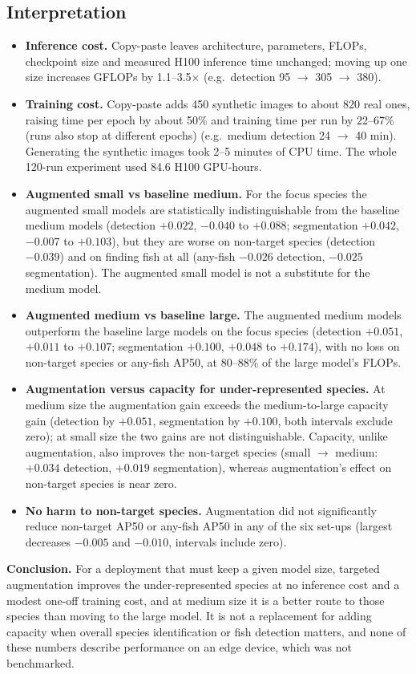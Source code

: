 \documentclass[11pt,a4paper]{article}
\begin{document}
\subsection*{Interpretation}
\begin{itemize}
\item \textbf{Inference cost.} Copy-paste leaves architecture, parameters, FLOPs, checkpoint size and measured H100 inference time
unchanged; moving up one size increases GFLOPs by 1.1--3.5$\times$ (e.g.\ detection 95 $\rightarrow$ 305 $\rightarrow$ 380).
\item \textbf{Training cost.} Copy-paste adds 450 synthetic images to about 820 real ones, raising time per epoch by about 50\% and
training time per run by 22--67\% (runs also stop at different epochs) (e.g.\ medium detection 24 $\rightarrow$ 40 min). Generating the synthetic images took 2--5
minutes of CPU time. The whole 120-run experiment used 84.6 H100 GPU-hours.
\item \textbf{Augmented small vs baseline medium.} For the focus species the augmented small models are statistically
indistinguishable from the baseline medium models (detection $+0.022$, $-0.040$ to $+0.088$; segmentation $+0.042$, $-0.007$ to $+0.103$),
but they are worse on non-target species (detection $-0.039$) and on finding fish at all (any-fish $-0.026$ detection, $-0.025$
segmentation). The augmented small model is not a substitute for the medium model.
\item \textbf{Augmented medium vs baseline large.} The augmented medium models outperform the baseline large models on the focus
species (detection $+0.051$, $+0.011$ to $+0.107$; segmentation $+0.100$, $+0.048$ to $+0.174$), with no loss on non-target species or
any-fish AP50, at 80--88\% of the large model's FLOPs.
\item \textbf{Augmentation versus capacity for under-represented species.} At medium size the augmentation gain exceeds the
medium-to-large capacity gain (detection by $+0.051$, segmentation by $+0.100$, both intervals exclude zero); at small size the two
gains are not distinguishable. Capacity, unlike augmentation, also improves the non-target species (small $\rightarrow$ medium:
$+0.034$ detection, $+0.019$ segmentation), whereas augmentation's effect on non-target species is near zero.
\item \textbf{No harm to non-target species.} Augmentation did not significantly reduce non-target AP50 or any-fish AP50 in any of the
six set-ups (largest decreases $-0.005$ and $-0.010$, intervals include zero).
\end{itemize}
\textbf{Conclusion.} For a deployment that must keep a given model size, targeted augmentation improves the under-represented species
at no inference cost and a modest one-off training cost, and at medium size it is a better route to those species than moving to
the large model. It is not a replacement for adding capacity when overall species identification or fish detection matters, and none
of these numbers describe performance on an edge device, which was not benchmarked.
\end{document}
